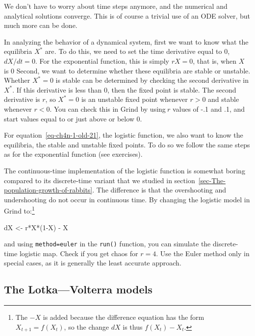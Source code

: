 \documentclass[
  a4paper,
  DIV=11,
  numbers=noendperiod,
  oneside]{scrreprt}
\newenvironment{Shaded}{}{}
\newcommand{\DecValTok}[1]{\textcolor[rgb]{0.00,0.36,0.77}{#1}}
\newcommand{\NormalTok}[1]{\textcolor[rgb]{0.14,0.16,0.18}{#1}}
\newcommand{\OtherTok}[1]{\textcolor[rgb]{0.44,0.26,0.76}{#1}}
\newcommand{\SpecialCharTok}[1]{\textcolor[rgb]{0.00,0.36,0.77}{#1}}
\begin{document}
We don't have to worry about time steps anymore, and the numerical and
analytical solutions converge. This is of course a trivial use of an ODE
solver, but much more can be done.

In analyzing the behavior of a dynamical system, first we want to know
what the equilibria \(X^{*}\) are\emph{.} To do this, we need to set the
time derivative equal to 0, \(dX/dt = 0\). For the exponential function,
this is simply \(rX = 0\), that is, when \(X\) is 0 Second, we want to
determine whether these equilibria are stable or unstable. Whether
\(X^{*}=0\) is stable can be determined by checking the second
derivative in \(X^{*}\). If this derivative is less than 0, then the
fixed point is stable. The second derivative is \(r\), so \(X^{*} = 0\)
is an unstable fixed point whenever \(r > 0\) and stable whenever
\(r < 0\). You can check this in Grind by using\(\ r\) values of -.1 and
.1, and start values equal to or just above or below 0.

For equation~\ref{eq-ch4n-1-old-21}, the logistic function, we also want
to know the equilibria, the stable and unstable fixed points. To do so
we follow the same steps as for the exponential function (see
exercises).

The continuous-time implementation of the logistic function is somewhat
boring compared to its discrete-time variant that we studied in
section~\ref{sec-The-population-growth-of-rabbits}. The difference is
that the overshooting and undershooting do not occur in continuous time.
By changing the logistic model in Grind to:\footnote{The \(-X\) is added
  because the difference equation has the form \(X_{t + 1} = f(X_{t})\),
  so the change \(dX\) is thus \(f(X_{t})-X_{t}\).}

\begin{Shaded}
\begin{Highlighting}[]
\NormalTok{dX }\OtherTok{\textless{}{-}}\NormalTok{ r}\SpecialCharTok{*}\NormalTok{X}\SpecialCharTok{*}\NormalTok{(}\DecValTok{1}\SpecialCharTok{{-}}\NormalTok{X) }\SpecialCharTok{{-}}\NormalTok{ X }
\end{Highlighting}
\end{Shaded}

and using \texttt{method=\textquotesingle{}euler\textquotesingle{}} in
the \texttt{run()} function, you can simulate the discrete-time logistic
map. Check if you get chaos for \(r = 4\). Use the Euler method only in
special cases, as it is generally the least accurate approach.

\subsection{The Lotka---Volterra
models}\label{sec-The-LotkaVolterra-models}
\end{document}

